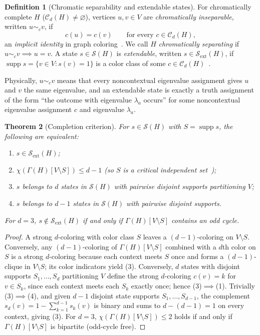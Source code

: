 \documentclass[aps,pra,reprint,superscriptaddress,longbibliography,nofootinbib,floatfix,10pt]{revtex4-2}
\newtheorem{theorem}{Theorem}
\theoremstyle{definition}\newtheorem{definition}[theorem]{Definition}
\theoremstyle{remark}\newtheorem{remark}[theorem]{Remark}
\newcommand{\Sc}{\mathcal S}\newcommand{\Cc}{\mathcal C}
\DeclareMathOperator{\supp}{supp}\DeclareMathOperator{\conv}{conv}
\begin{document}
\begin{definition}[Chromatic separability and extendable states]\label{def:inseparable}
For chromatically complete $H$ ($\Cc_d(H)\ne\varnothing$), vertices $u,v\in V$ are \emph{chromatically inseparable}, written $u\sim_c v$, if
\begin{equation}\label{eq:inseparable}
c(u)=c(v)\qquad\text{for every }c\in\Cc_d(H),
\end{equation}
an \emph{implicit identity} in graph coloring~\cite[Def.~3.8]{martin2009}. We call $H$ \emph{chromatically separating} if $u\sim_c v\implies u=v$. A state $s\in\Sc(H)$ is \emph{extendable}, written $s\in\Sc_{\mathrm{ext}}(H)$, if $\supp s=\{v\in V:s(v)=1\}$ is a color class of some $c\in\Cc_d(H)$~\cite{svozil-2020-c,svozil-2021-chroma,svozil-2025-color}.
\end{definition}
Physically, $u\sim_c v$ means that every noncontextual eigenvalue assignment gives $u$ and $v$ the same eigenvalue, and an extendable state is exactly a truth assignment of the form ``the outcome with eigenvalue $\lambda_a$ occurs'' for some noncontextual eigenvalue assignment $c$ and eigenvalue $\lambda_a$.

\begin{theorem}[Completion criterion]\label{thm:completion}
For $s\in\Sc(H)$ with $S=\supp s$, the following are equivalent:
\begin{enumerate}
\item $s\in\Sc_{\mathrm{ext}}(H)$;
\item $\chi(\Gamma(H)[V\setminus S])\le d-1$ (so $S$ is a critical independent set~\cite[Def.~3.3]{martin2009});
\item $s$ belongs to $d$ states in $\Sc(H)$ with pairwise disjoint supports partitioning $V$;
\item $s$ belongs to $d-1$ states in $\Sc(H)$ with pairwise disjoint supports.
\end{enumerate}
For $d=3$, $s\notin\Sc_{\mathrm{ext}}(H)$ if and only if $\Gamma(H)[V\setminus S]$ contains an odd cycle.
\end{theorem}
\begin{proof}
A strong $d$-coloring with color class $S$ leaves a $(d-1)$-coloring on $V\setminus S$. Conversely, any $(d-1)$-coloring of $\Gamma(H)[V\setminus S]$ combined with a $d$th color on $S$ is a strong $d$-coloring because each context meets $S$ once and forms a $(d-1)$-clique in $V\setminus S$; its color indicators yield (3). Conversely, $d$ states with disjoint supports $S_1,\ldots,S_d$ partitioning $V$ define the strong $d$-coloring $c(v)=k$ for $v\in S_k$, since each context meets each $S_k$ exactly once; hence (3)$\implies$(1). Trivially (3)$\implies$(4), and given $d-1$ disjoint state supports $S_1,\ldots,S_{d-1}$, the complement $s_d(v)=1-\sum_{k=1}^{d-1}s_k(v)$ is binary and sums to $d-(d-1)=1$ on every context, giving (3). For $d=3$, $\chi(\Gamma(H)[V\setminus S])\le 2$ holds if and only if $\Gamma(H)[V\setminus S]$ is bipartite (odd-cycle free).
\end{proof}
\end{document}
